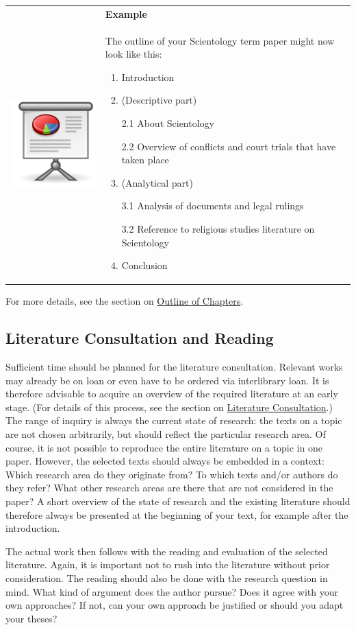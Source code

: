 \documentclass[
  english,
]{scrreprt}
\newlength{\iconwidth}
\newenvironment{displaybox}[2]{%
    \begin{center}
        \setlength\arrayrulewidth{0.75pt}%
        \arrayrulecolor{white}%
        \renewcommand{\arraystretch}{1.3}%
        \begin{tabular}{p{\iconwidth}p{\linewidth-4\tabcolsep-\iconwidth}}
            \multirow{2}{*}{#2}&\cellcolor{boxheadcol}\textbf{\sffamily\color{white}#1} \\%
            \hhline{~-}%
            &\cellcolor{boxcol}%
}{%
            \\
        \end{tabular}
        \arrayrulecolor{black}
    \end{center}
}
\newenvironment{Example}{%
\begin{displaybox}{Example}{\includegraphics[width=\iconwidth]{images/icon-beispiel}}}%
{\end{displaybox}}
\begin{document}
\begin{Example}

The outline of your Scientology term paper might now look like this:

\begin{enumerate}
\def\labelenumi{\arabic{enumi}.}
\item
  Introduction
\item
  (Descriptive part)

  2.1 About Scientology

  2.2 Overview of conflicts and court trials that have taken place
\item
  (Analytical part)

  3.1 Analysis of documents and legal rulings

  3.2 Reference to religious studies literature on Scientology
\item
  Conclusion
\end{enumerate}

\end{Example}

For more details, see the section on \hyperref[sec:outline]{Outline of Chapters}.

\subsection{Literature Consultation and Reading}\label{literature-consultation-and-reading}

Sufficient time should be planned for the literature consultation. Relevant works may already be on loan or even have to be ordered via interlibrary loan. It is therefore advisable to acquire an overview of the required literature at an early stage. (For details of this process, see the section on \hyperref[sec:literature_consultation]{Literature Consultation}.) The range of inquiry is always the current state of research: the texts on a topic are not chosen arbitrarily, but should reflect the particular research area. Of course, it is not possible to reproduce the entire literature on a topic in one paper. However, the selected texts should always be embedded in a context: Which research area do they originate from? To which texts and/or authors do they refer? What other research areas are there that are not considered in the paper? A short overview of the state of research and the existing literature should therefore always be presented at the beginning of your text, for example after the introduction.

The actual work then follows with the reading and evaluation of the selected literature. Again, it is important not to rush into the literature without prior consideration. The reading should also be done with the research question in mind. What kind of argument does the author pursue? Does it agree with your own approaches? If not, can your own approach be justified or should you adapt your theses?
\end{document}
